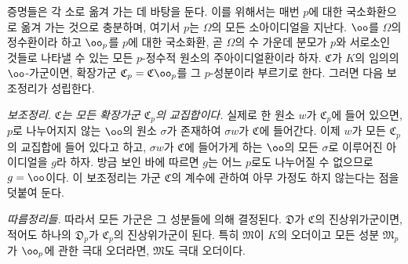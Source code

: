 
증명들은 각 소로 옮겨 가는 데 바탕을 둔다. 이를 위해서는 매번 $p$에 대한 국소화환으로 옮겨 가는 것으로 충분하며, 여기서 $p$는 $\Omega$의 모든 소아이디얼을 지난다. $\oo$를 $\Omega$의 정수환이라 하고 $\oo_p$를 $p$에 대한 국소화환, 곧 $\Omega$의 수 가운데 분모가 $p$와 서로소인 것들로 나타낼 수 있는 모든 $p$-정수적 원소의 주아이디얼환이라 하자. $\mathfrak C$가 $K$의 임의의 $\oo$-가군이면, 확장가군 $\mathfrak C_p=\mathfrak C\oo_p$를 그 $p$-성분이라 부르기로 한다. 그러면 다음 보조정리가 성립한다.

\medskip
\noindent\emph{보조정리. $\mathfrak C$는 모든 확장가군 $\mathfrak C_p$의 교집합이다.} 실제로 한 원소 $w$가 $\mathfrak C_p$에 들어 있으면, $p$로 나누어지지 않는 $\oo$의 원소 $\sigma$가 존재하여 $\sigma w$가 $\mathfrak C$에 들어간다. 이제 $w$가 모든 $\mathfrak C_p$의 교집합에 들어 있다고 하고, $\sigma w$가 $\mathfrak C$에 들어가게 하는 $\oo$의 모든 $\sigma$로 이루어진 아이디얼을 $g$라 하자. 방금 보인 바에 따르면 $g$는 어느 $p$로도 나누어질 수 없으므로 $g=\oo$이다. 이 보조정리는 가군 $\mathfrak C$의 계수에 관하여 아무 가정도 하지 않는다는 점을 덧붙여 둔다.

\emph{따름정리들.} 따라서 모든 가군은 그 성분들에 의해 결정된다. $\mathfrak D$가 $\mathfrak C$의 진상위가군이면, 적어도 하나의 $\mathfrak D_p$가 $\mathfrak C_p$의 진상위가군이 된다. 특히 $\mathfrak M$이 $K$의 오더이고 모든 성분 $\mathfrak M_p$가 $\oo_p$에 관한 극대 오더라면, $\mathfrak M$도 극대 오더이다.
